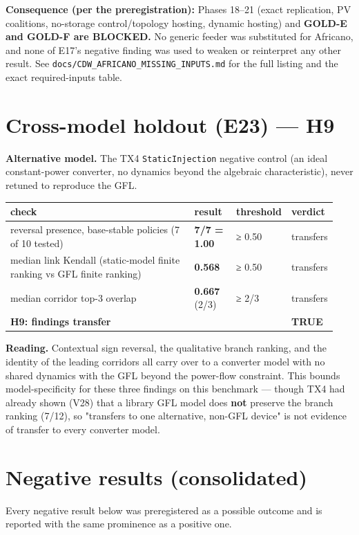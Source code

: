 \documentclass[10pt,a4paper]{article}
\begin{document}
\textbf{Consequence (per the preregistration):} Phases 18–21 (exact replication, PV coalitions, no-storage control/topology hosting, dynamic hosting) and \textbf{GOLD-E and GOLD-F are BLOCKED.} No generic feeder was substituted for Africano, and none of E17's negative finding was used to weaken or reinterpret any other result. See \texttt{docs/\allowbreak{}CDW\_\allowbreak{}AFRICANO\_\allowbreak{}MISSING\_\allowbreak{}INPUTS.md} for the full listing and the exact required-inputs table.

\section{Cross-model holdout (E23) — H9}
\textbf{Alternative model.} The TX4 \texttt{StaticInjection} negative control (an ideal constant-power converter, no dynamics beyond the algebraic characteristic), never retuned to reproduce the GFL.

{\small
\begin{longtable}{L{0.642\linewidth}L{0.136\linewidth}L{0.081\linewidth}L{0.081\linewidth}}
\toprule
\textbf{check} & \textbf{result} & \textbf{threshold} & \textbf{verdict} \\
\midrule
\endhead
reversal presence, base-stable policies (7 of 10 tested) & \textbf{7/7 = 1.00} & ≥ 0.50 & transfers \\
median link Kendall (static-model finite ranking vs GFL finite ranking) & \textbf{0.568} & ≥ 0.50 & transfers \\
median corridor top-3 overlap & \textbf{0.667} (2/3) & ≥ 2/3 & transfers \\
\textbf{H9: findings transfer} &  &  & \textbf{TRUE} \\
\bottomrule
\end{longtable}}
\textbf{Reading.} Contextual sign reversal, the qualitative branch ranking, and the identity of the leading corridors all carry over to a converter model with no shared dynamics with the GFL beyond the power-flow constraint. This bounds model-specificity for these three findings on this benchmark — though TX4 had already shown (V28) that a library GFL model does \textbf{not} preserve the branch ranking (7/12), so "transfers to one alternative, non-GFL device" is not evidence of transfer to every converter model.

\section{Negative results (consolidated)}
Every negative result below was preregistered as a possible outcome and is reported with the same prominence as a positive one.
\end{document}
